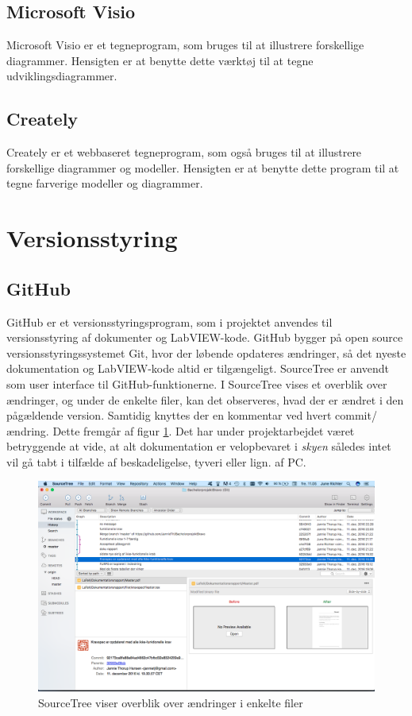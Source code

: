 	\subsection{Microsoft Visio}   
	Microsoft Visio er et tegneprogram, som bruges til at illustrere forskellige diagrammer. Hensigten er at benytte dette værktøj til at tegne udviklingsdiagrammer.
	
	\subsection{Creately}
	Creately er et webbaseret tegneprogram, som også bruges til at illustrere forskellige diagrammer og modeller. Hensigten er at benytte dette program til at tegne farverige modeller og diagrammer.    

\section{Versionsstyring}
\subsection{GitHub}
GitHub er et versionsstyringsprogram, som i projektet anvendes til versionsstyring af dokumenter og LabVIEW-kode. GitHub
bygger på open source versionsstyringssystemet Git, hvor der løbende opdateres ændringer, så det nyeste dokumentation og LabVIEW-kode altid er tilgængeligt. SourceTree er anvendt som user interface til GitHub-funktionerne. I SourceTree vises et overblik over ændringer, og under de enkelte filer, kan det observeres, hvad der er ændret i den pågældende version. Samtidig knyttes der en kommentar ved hvert commit/ ændring. Dette fremgår af figur \ref{fig:git}. Det har under projektarbejdet været betryggende at vide, at alt dokumentation er velopbevaret i \textit{skyen} således intet vil gå tabt i tilfælde af beskadeligelse, tyveri eller lign. af PC. 

\begin{figure}[htb]
\centering
\includegraphics[width=5in]{github.png}
\caption{SourceTree viser overblik over ændringer i enkelte filer}
\label{fig:git}	
\end{figure}